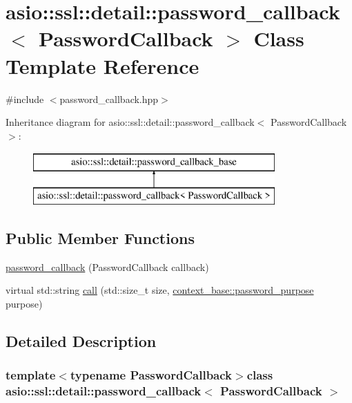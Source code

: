 \hypertarget{classasio_1_1ssl_1_1detail_1_1password__callback}{}\section{asio\+:\+:ssl\+:\+:detail\+:\+:password\+\_\+callback$<$ Password\+Callback $>$ Class Template Reference}
\label{classasio_1_1ssl_1_1detail_1_1password__callback}


{\ttfamily \#include $<$password\+\_\+callback.\+hpp$>$}

Inheritance diagram for asio\+:\+:ssl\+:\+:detail\+:\+:password\+\_\+callback$<$ Password\+Callback $>$\+:\begin{figure}[H]
\begin{center}
\leavevmode
\includegraphics[height=2.000000cm]{classasio_1_1ssl_1_1detail_1_1password__callback}
\end{center}
\end{figure}
\subsection*{Public Member Functions}
\begin{DoxyCompactItemize}
\item 
\hyperlink{classasio_1_1ssl_1_1detail_1_1password__callback_a694d95318c25f1483f4567b43bf4577b}{password\+\_\+callback} (Password\+Callback callback)
\item 
virtual std\+::string \hyperlink{classasio_1_1ssl_1_1detail_1_1password__callback_ae832e50c50f08d00646b22e744006276}{call} (std\+::size\+\_\+t size, \hyperlink{classasio_1_1ssl_1_1context__base_a0e5aec1cd0f3db28becde1dca686c855}{context\+\_\+base\+::password\+\_\+purpose} purpose)
\end{DoxyCompactItemize}


\subsection{Detailed Description}
\subsubsection*{template$<$typename Password\+Callback$>$class asio\+::ssl\+::detail\+::password\+\_\+callback$<$ Password\+Callback $>$}



